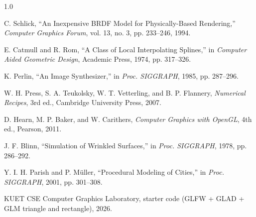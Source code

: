 \documentclass[12pt, a4paper]{report}
\begin{document}
\begin{spacing}{1.0}
\begin{list}{}{
    \setlength{\leftmargin}{0.31in}
    \setlength{\itemindent}{-0.31in}
    \setlength{\topsep}{0pt}
    \setlength{\itemsep}{2pt}
    \setlength{\parsep}{0pt}
  }
    \item[12.] C. Schlick, ``An Inexpensive BRDF Model for Physically-Based Rendering,'' \textit{Computer Graphics Forum}, vol. 13, no. 3, pp. 233--246, 1994.

    \item[13.] E. Catmull and R. Rom, ``A Class of Local Interpolating Splines,'' in \textit{Computer Aided Geometric Design}, Academic Press, 1974, pp. 317--326.

    \item[14.] K. Perlin, ``An Image Synthesizer,'' in \textit{Proc. SIGGRAPH}, 1985, pp. 287--296.

    \item[15.] W. H. Press, S. A. Teukolsky, W. T. Vetterling, and B. P. Flannery, \textit{Numerical Recipes}, 3rd ed., Cambridge University Press, 2007.

    \item[16.] D. Hearn, M. P. Baker, and W. Carithers, \textit{Computer Graphics with OpenGL}, 4th ed., Pearson, 2011.

    \item[17.] J. F. Blinn, ``Simulation of Wrinkled Surfaces,'' in \textit{Proc. SIGGRAPH}, 1978, pp. 286--292.

    \item[18.] Y. I. H. Parish and P. M\"uller, ``Procedural Modeling of Cities,'' in \textit{Proc. SIGGRAPH}, 2001, pp. 301--308.

    \item[19.] KUET CSE Computer Graphics Laboratory, starter code (GLFW + GLAD + GLM triangle and rectangle), 2026.

  \end{list}
\end{spacing}
\end{document}
